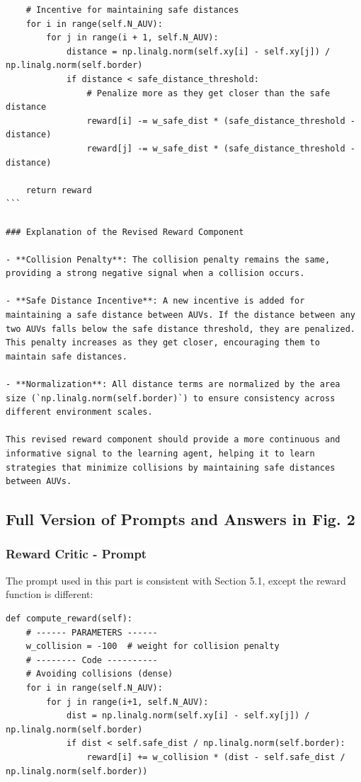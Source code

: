 \documentclass{article}
\begin{document}
\begin{verbatim}
    # Incentive for maintaining safe distances
    for i in range(self.N_AUV):
        for j in range(i + 1, self.N_AUV):
            distance = np.linalg.norm(self.xy[i] - self.xy[j]) / np.linalg.norm(self.border)
            if distance < safe_distance_threshold:
                # Penalize more as they get closer than the safe distance
                reward[i] -= w_safe_dist * (safe_distance_threshold - distance)
                reward[j] -= w_safe_dist * (safe_distance_threshold - distance)

    return reward
```

### Explanation of the Revised Reward Component

- **Collision Penalty**: The collision penalty remains the same, providing a strong negative signal when a collision occurs.

- **Safe Distance Incentive**: A new incentive is added for maintaining a safe distance between AUVs. If the distance between any two AUVs falls below the safe distance threshold, they are penalized. This penalty increases as they get closer, encouraging them to maintain safe distances.

- **Normalization**: All distance terms are normalized by the area size (`np.linalg.norm(self.border)`) to ensure consistency across different environment scales.

This revised reward component should provide a more continuous and informative signal to the learning agent, helping it to learn strategies that minimize collisions by maintaining safe distances between AUVs.

\end{verbatim}


\subsection{Full Version of Prompts and Answers in Fig. 2}

\subsubsection{Reward Critic - Prompt}

The prompt used in this part is consistent with Section 5.1, except the reward function is different:
 
 \begin{verbatim}
def compute_reward(self):
    # ------ PARAMETERS ------
    w_collision = -100  # weight for collision penalty
    # -------- Code ----------
    # Avoiding collisions (dense)
    for i in range(self.N_AUV):
        for j in range(i+1, self.N_AUV):
            dist = np.linalg.norm(self.xy[i] - self.xy[j]) / np.linalg.norm(self.border)
            if dist < self.safe_dist / np.linalg.norm(self.border):
                reward[i] += w_collision * (dist - self.safe_dist / np.linalg.norm(self.border))

\end{verbatim}
\end{document}
